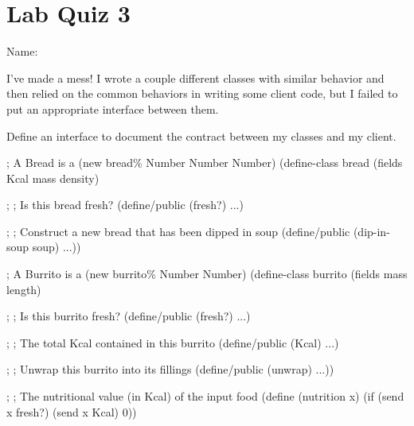\documentclass[10pt]{article}
\begin{document}
\section*{Lab Quiz 3}

\bigskip
\bigskip
Name: \underline{\hspace*{4in}}

\bigskip
\setlength{\parskip}{8pt}

I've made a mess! I wrote a couple different classes with similar behavior and
then relied on the common behaviors in writing some client code, but I failed to
put an appropriate interface between them.

Define an interface to document the contract between my classes and my client.

\medskip

\begin{schemedisplay}
  ; A Bread is a (new bread\% Number Number Number)
  (define-class bread%
    (fields Kcal mass density)

    ; 
    ; Is this bread fresh?
    (define/public (fresh?)
      ...)

    ; 
    ; Construct a new bread that has been dipped in soup
    (define/public (dip-in-soup soup)
      ...))

  ; A Burrito is a (new burrito\% Number Number)
  (define-class burrito%
    (fields mass length)

    ; 
    ; Is this burrito fresh?
    (define/public (fresh?)
      ...)

    ; 
    ; The total Kcal contained in this burrito
    (define/public (Kcal)
      ...)

    ; 
    ; Unwrap this burrito into its fillings
    (define/public (unwrap)
      ...))

  ; 
  ; The nutritional value (in Kcal) of the input food
  (define (nutrition x)
    (if (send x fresh?)
      (send x Kcal)
      0))
\end{schemedisplay}
\end{document}

